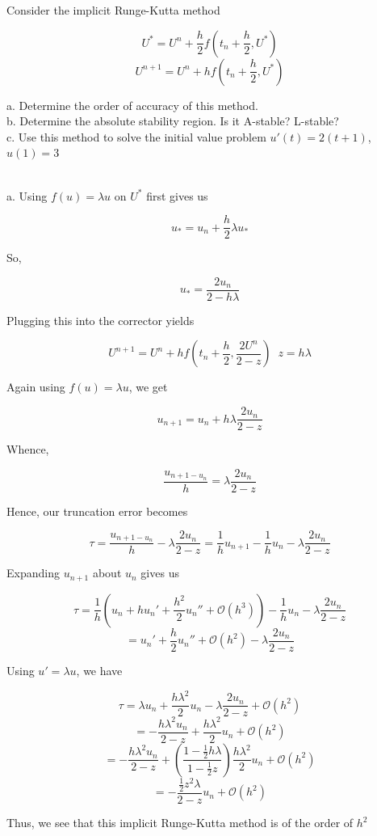 Consider the implicit Runge-Kutta method

$$U^*=U^n+\frac{h}{2}f(t_n+\frac{h}{2},U^*)$$
$$U^{n+1}=U^n+hf(t_n+\frac{h}{2},U^*)$$

a. Determine the order of accuracy of this method.\\
b. Determine the absolute stability region. Is it A-stable? L-stable?\\
c. Use this method to solve the initial value problem $u'(t)=2(t+1)$, $u(1)=3$\\

\begin{solution}\renewcommand{\qedsymbol}{}\ \\
    a. Using $f(u)=\lambda u$ on $U^*$ first gives us

    $$u_*=u_n+\frac{h}{2}\lambda u_*$$

    So,

    $$u_*=\frac{2u_n}{2-h\lambda}$$

    Plugging this into the corrector yields

    $$U^{n+1}=U^n+hf(t_n+\frac{h}{2},\frac{2U^n}{2-z})\;\;z=h\lambda$$

    Again using $f(u)=\lambda u$, we get

    $$u_{n+1}=u_n+h\lambda\frac{2u_n}{2-z}$$

    Whence,

    $$\frac{u_{n+1-u_n}}{h}=\lambda\frac{2u_n}{2-z}$$

    Hence, our truncation error becomes

    $$\tau=\frac{u_{n+1-u_n}}{h}-\lambda\frac{2u_n}{2-z}=\frac1hu_{n+1}-\frac1hu_n-
    \lambda\frac{2u_n}{2-z}$$

    Expanding $u_{n+1}$ about $u_n$ gives us

    $$\tau=\frac1h(u_n+hu_n'+\frac{h^2}{2}u_n''+\mathcal{O}(h^3))-\frac1hu_n-
    \lambda\frac{2u_n}{2-z}$$
    $$=u_n'+\frac{h}{2}u_n''+\mathcal{O}(h^2)-\lambda\frac{2u_n}{2-z}$$

    Using $u'=\lambda u$, we have

    $$\tau=\lambda u_n+\frac{h\lambda^2}{2}u_n-\lambda\frac{2u_n}{2-z}+\mathcal{O}(h^2)$$
    $$=-\frac{h\lambda^2u_n}{2-z}+\frac{h\lambda^2}{2}u_n+\mathcal{O}(h^2)$$
    $$=-\frac{h\lambda^2u_n}{2-z}+(\frac{1-\frac12h\lambda}{1-\frac12z})\frac{h\lambda^2}{2}u_n+
    \mathcal{O}(h^2)$$
    $$=-\frac{\frac{1}{2}z^2\lambda}{2-z}u_n+\mathcal{O}(h^2)$$

    Thus, we see that this implicit Runge-Kutta method is of the order of $h^2$\\


\end{solution}
